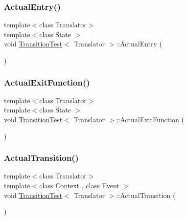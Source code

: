 \mbox{\label{struct_transition_test_acdaa9bae86b0d04bd600a1f15ddef321}} 
\subsubsection{\texorpdfstring{Actual\+Entry()}{ActualEntry()}}
{\footnotesize\ttfamily template$<$class Translator$>$ \\
template$<$class State $>$ \\
void \mbox{\hyperlink{struct_transition_test}{Transition\+Test}}$<$ Translator $>$\+::Actual\+Entry (\begin{DoxyParamCaption}{ }\end{DoxyParamCaption})\hspace{0.3cm}{\ttfamily [inline]}}

\mbox{\label{struct_transition_test_a274fb4369afe2847f7d1007b5d678382}} 
\subsubsection{\texorpdfstring{Actual\+Exit\+Function()}{ActualExitFunction()}}
{\footnotesize\ttfamily template$<$class Translator$>$ \\
template$<$class State $>$ \\
void \mbox{\hyperlink{struct_transition_test}{Transition\+Test}}$<$ Translator $>$\+::Actual\+Exit\+Function (\begin{DoxyParamCaption}{ }\end{DoxyParamCaption})\hspace{0.3cm}{\ttfamily [inline]}}

\mbox{\label{struct_transition_test_a48a6fb92eaa75fcfdb1c4914ad322d03}} 
\subsubsection{\texorpdfstring{Actual\+Transition()}{ActualTransition()}}
{\footnotesize\ttfamily template$<$class Translator$>$ \\
template$<$class Context , class Event $>$ \\
void \mbox{\hyperlink{struct_transition_test}{Transition\+Test}}$<$ Translator $>$\+::Actual\+Transition (\begin{DoxyParamCaption}{ }\end{DoxyParamCaption})\hspace{0.3cm}{\ttfamily [inline]}}


